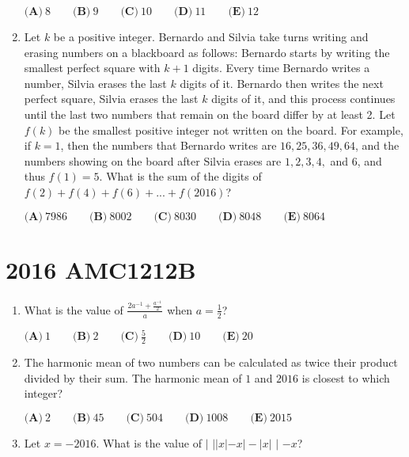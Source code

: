 \documentclass{article}
\begin{document}
\begin{enumerate}[label=\arabic*., itemsep=0.5em]
$\textbf{(A)}\ 8\qquad\textbf{(B)}\ 9\qquad\textbf{(C)}\ 10\qquad\textbf{(D)}\ 11\qquad\textbf{(E)}\ 12$\par \vspace{0.5em}\item Let $k$ be a positive integer. Bernardo and Silvia take turns writing and erasing numbers on a blackboard as follows: Bernardo starts by writing the smallest perfect square with $k+1$ digits. Every time Bernardo writes a number, Silvia erases the last $k$ digits of it. Bernardo then writes the next perfect square, Silvia erases the last $k$ digits of it, and this process continues until the last two numbers that remain on the board differ by at least 2. Let $f(k)$ be the smallest positive integer not written on the board. For example, if $k = 1$, then the numbers that Bernardo writes are $16, 25, 36, 49, 64$, and the numbers showing on the board after Silvia erases are $1, 2, 3, 4,$ and $6$, and thus $f(1) = 5$. What is the sum of the digits of $f(2) + f(4)+ f(6) + ... + f(2016)$?

$\textbf{(A)}\ 7986\qquad\textbf{(B)}\ 8002\qquad\textbf{(C)}\ 8030\qquad\textbf{(D)}\ 8048\qquad\textbf{(E)}\ 8064$\par \vspace{0.5em}\end{enumerate}\newpage\section*{2016 AMC1212B}\begin{enumerate}[label=\arabic*., itemsep=0.5em]\item What is the value of $\frac{2a^{-1}+\frac{a^{-1}}{2}}{a}$ when $a= \frac{1}{2}$?

$\textbf{(A)}\ 1\qquad\textbf{(B)}\ 2\qquad\textbf{(C)}\ \frac{5}{2}\qquad\textbf{(D)}\ 10\qquad\textbf{(E)}\ 20$\par \vspace{0.5em}\item The harmonic mean of two numbers can be calculated as twice their product divided by their sum. The harmonic mean of $1$ and $2016$ is closest to which integer?

$\textbf{(A)}\ 2 \qquad
\textbf{(B)}\ 45 \qquad
\textbf{(C)}\ 504 \qquad
\textbf{(D)}\ 1008 \qquad
\textbf{(E)}\ 2015 $\par \vspace{0.5em}\item Let $x=-2016$. What is the value of $\bigg|$ $||x|-x|-|x|$ $\bigg|$ $-x$?


\end{enumerate}
\end{document}
